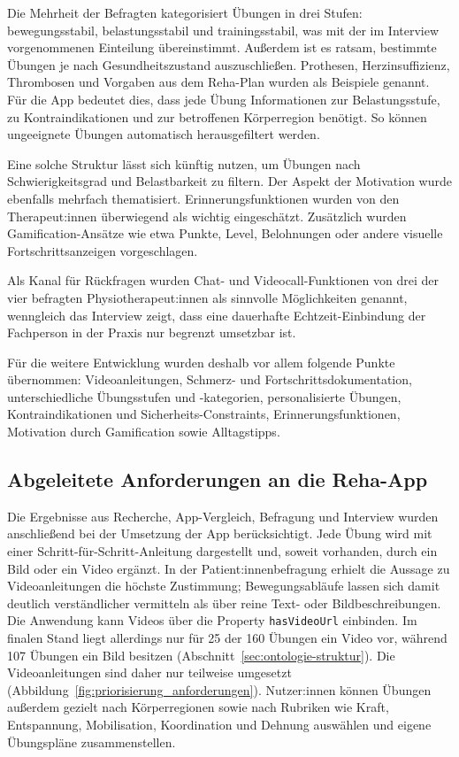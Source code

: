 Die Mehrheit der Befragten kategorisiert Übungen in drei Stufen: bewegungsstabil, belastungsstabil und trainingsstabil, was mit der im Interview vorgenommenen Einteilung übereinstimmt. Außerdem ist es ratsam, bestimmte Übungen je nach Gesundheitszustand auszuschließen. Prothesen, Herzinsuffizienz, Thrombosen und Vorgaben aus dem Reha-Plan wurden als Beispiele genannt. Für die App bedeutet dies, dass jede Übung Informationen zur Belastungsstufe, zu Kontraindikationen und zur betroffenen Körperregion benötigt. So können ungeeignete Übungen automatisch herausgefiltert werden.

Eine solche Struktur lässt sich künftig nutzen, um Übungen nach Schwierigkeitsgrad und Belastbarkeit zu filtern. Der Aspekt der Motivation wurde ebenfalls mehrfach thematisiert. Erinnerungsfunktionen wurden von den Therapeut:innen überwiegend als wichtig eingeschätzt. Zusätzlich wurden Gamification-Ansätze wie etwa Punkte, Level, Belohnungen oder andere visuelle Fortschrittsanzeigen vorgeschlagen.

Als Kanal für Rückfragen wurden Chat- und Videocall-Funktionen von drei der vier befragten Physiotherapeut:innen als sinnvolle Möglichkeiten genannt, wenngleich das Interview zeigt, dass eine dauerhafte Echtzeit-Einbindung der Fachperson in der Praxis nur begrenzt umsetzbar ist.

Für die weitere Entwicklung wurden deshalb vor allem folgende Punkte übernommen: Videoanleitungen, Schmerz- und Fortschrittsdokumentation, unterschiedliche Übungsstufen und -kategorien, personalisierte Übungen, Kontraindikationen und Sicherheits-Constraints, Erinnerungsfunktionen, Motivation durch Gamification sowie Alltagstipps.

\subsection{Abgeleitete Anforderungen an die Reha-App}
\label{sec:anforderungen}

Die Ergebnisse aus Recherche, App-Vergleich, Befragung und Interview wurden anschließend bei der Umsetzung der App berücksichtigt. Jede Übung wird mit einer Schritt-für-Schritt-Anleitung dargestellt und, soweit vorhanden, durch ein Bild oder ein Video ergänzt. In der Patient:innenbefragung erhielt die Aussage zu Videoanleitungen die höchste Zustimmung; Bewegungsabläufe lassen sich damit deutlich verständlicher vermitteln als über reine Text- oder Bildbeschreibungen. Die Anwendung kann Videos über die Property \texttt{hasVideoUrl} einbinden. Im finalen Stand liegt allerdings nur für 25 der 160 Übungen ein Video vor, während 107 Übungen ein Bild besitzen (Abschnitt~\ref{sec:ontologie-struktur}). Die Videoanleitungen sind daher nur teilweise umgesetzt (Abbildung~\ref{fig:priorisierung_anforderungen}). Nutzer:innen können Übungen außerdem gezielt nach Körperregionen sowie nach Rubriken wie Kraft, Entspannung, Mobilisation, Koordination und Dehnung auswählen und eigene Übungspläne zusammenstellen.


